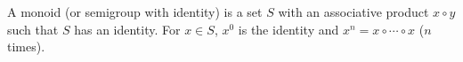 A monoid (or semigroup with identity) is a set $S$ with an associative product $x \circ y$ such that $S$ has an identity. For $x \in S$, $x^0$ is the identity and $x^n = x \circ \cdots \circ x$ ($n$ times).
